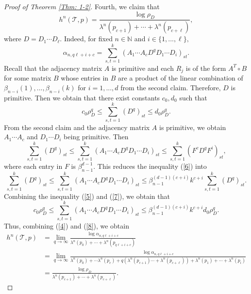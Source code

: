 \documentclass{amsart}
\theoremstyle{definition}
\begin{document}
\begin{proof}[Proof of Theorem \ref{Thm: 1-2}]
Fourth, we claim that
\begin{equation}\label{c4}
h^n(\mathcal{T},p)=\frac{\log \rho_D}{\lambda^n(p_{c+1})+\cdots +\lambda^n(p_{c+\ell})},
\end{equation}
where $D=D_1\cdots D_\ell.$ Indeed, for fixed $n\in\mathbb{N}$ and $i\in\{1,...,\ell\},$
\begin{equation}\label{4}
\alpha_{n,q\ell+i+c}=\sum_{s,t=1}^k(A_1\cdots A_cD^qD_1\cdots D_i)_{st}.
\end{equation}
Recall that the adjacency matrix $A$ is primitive and each $R_j$ is of the form $A^T \circ B$ for some matrix $B$ whose entries in $B$ are a product of the linear combination of $\beta_{n-i}(1),...,\beta_{n-i}(k)$ for $i=1,...,d$ from the second claim. Therefore, $D$ is primitive. Then we obtain that there exist constants $c_0,d_0$ such that 
\begin{equation}\label{5}
c_0\rho_D^q\leq \sum_{s,t=1}^k(D^q)_{st}\leq d_0 \rho_D^q.
\end{equation}
From the second claim and the adjacency matrix $A$ is primitive, we obtain $A_1\cdots A_c$ and $D_1\cdots D_i$ being primitive. Then
\begin{equation}\label{6}
\sum_{s,t=1}^k(D^q)_{st}\leq\sum_{s,t=1}^k(A_1\cdots A_cD^qD_1\cdots D_i)_{st}\leq \sum_{s,t=1}^k(F^cD^qF^i)_{st},
\end{equation}
where each entry in $F$ is $\beta_{n-1}^{d-1}.$ This reduces the inequality (\ref{6}) into
\begin{equation}\label{7}
    \sum_{s,t=1}^k(D^q)_{st}\leq\sum_{s,t=1}^k(A_1\cdots A_cD^qD_1\cdots D_i)_{st}\leq \beta_{n-1}^{(d-1)(c+i)}k^{c+i}\sum_{s,t=1}^k(D^q)_{st}.
\end{equation}
Combining the inequality (\ref{5}) and (\ref{7}), we obtain that 
\begin{equation}\label{8}
c_0\rho_D^q\leq\sum_{s,t=1}^k(A_1\cdots A_cD^qD_1\cdots D_i)_{st}\leq \beta_{n-1}^{(d-1)(c+i)}k^{c+i}d_0\rho_D^q.
\end{equation}
Thus, combining (\ref{4}) and (\ref{8}), we obtain 
\begin{align*}
h^n(\mathcal{T},p)&=\lim_{q\rightarrow \infty}\frac{\log \alpha_{n,q\ell+i+c}}{\lambda^n(p_0)+\cdots +\lambda^n(p_{q\ell+i+c})}\\
&=\lim_{q\rightarrow \infty}\frac{\log \alpha_{n,q\ell+i+c}}{\lambda^n(p_0)+\cdots \lambda^n(p_c)+q(\lambda^n(p_{c+1})\cdots +\lambda^n(p_{c+\ell}))+\lambda^n(p_1)+\cdots +\lambda^n(p_i)} \\
&=\frac{\log \rho_D}{\lambda^n (p_{c+1})+\cdots +\lambda^n(p_{c+\ell})}.
\end{align*}


\end{proof}
\end{document}
